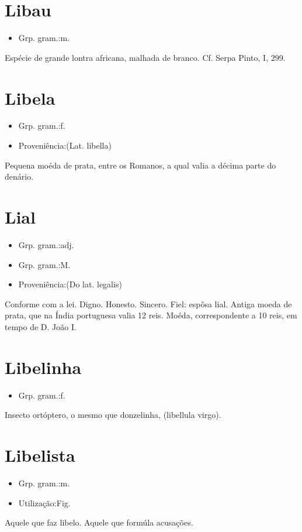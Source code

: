\section{Libau}
\begin{itemize}
\item {Grp. gram.:m.}
\end{itemize}
Espécie de grande lontra africana, malhada de branco. Cf. Serpa Pinto, I, 299.
\section{Libela}
\begin{itemize}
\item {Grp. gram.:f.}
\end{itemize}
\begin{itemize}
\item {Proveniência:(Lat. \textunderscore libella\textunderscore )}
\end{itemize}
Pequena moéda de prata, entre os Romanos, a qual valia a décima parte do denário.
\section{Lial}
\begin{itemize}
\item {Grp. gram.:adj.}
\end{itemize}
\begin{itemize}
\item {Grp. gram.:M.}
\end{itemize}
\begin{itemize}
\item {Proveniência:(Do lat. \textunderscore legalis\textunderscore )}
\end{itemize}
Conforme com a lei.
Digno.
Honesto.
Sincero.
Fiel: \textunderscore espôsa lial\textunderscore .
Antiga moeda de prata, que na Índia portuguesa valia 12 reis.
Moéda, correspondente a 10 reis, em tempo de D. João I.
\section{Libelinha}
\begin{itemize}
\item {Grp. gram.:f.}
\end{itemize}
Insecto ortóptero, o mesmo que \textunderscore donzelinha\textunderscore , (\textunderscore libellula virgo\textunderscore ).
\section{Libelista}
\begin{itemize}
\item {Grp. gram.:m.}
\end{itemize}
\begin{itemize}
\item {Utilização:Fig.}
\end{itemize}
Aquele que faz libelo.
Aquele que formúla acusações.
